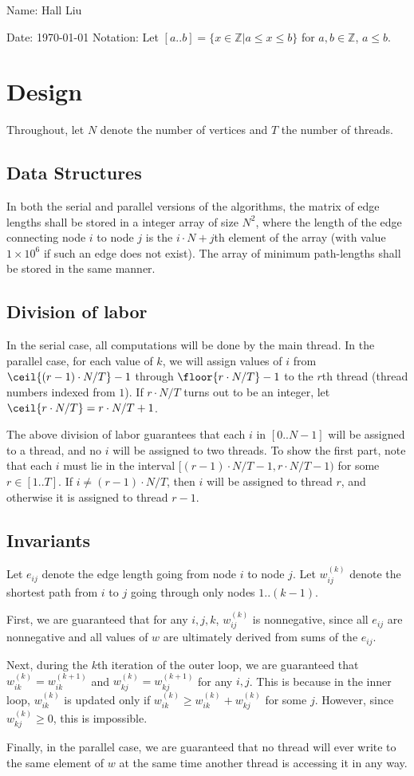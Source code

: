 \documentclass{article}
\newcommand{\zn}{\mathbb{Z}}
\begin{document}
Name: Hall Liu

Date: \today 
Notation: Let $[a..b]=\{x\in\zn|a\leq x\leq b\}$ for $a,b\in\zn$, $a\leq b$.
\section*{Design}
Throughout, let $N$ denote the number of vertices and $T$ the number of threads.
\subsection*{Data Structures}
In both the serial and parallel versions of the algorithms, the matrix of edge lengths shall be stored in a integer array of size $N^2$, where the length of the edge connecting node $i$ to node $j$ is the $i\cdot N+j$th element of the array (with value $1\times10^6$ if such an edge does not exist). The array of minimum path-lengths shall be stored in the same manner. 

\subsection*{Division of labor}
In the serial case, all computations will be done by the main thread. In the parallel case, for each value of $k$, we will assign values of $i$ from $\ceil{(r-1)\cdot N/T}-1$ through $\floor{r\cdot N/T}-1$ to the $r$th thread (thread numbers indexed from $1$). If $r\cdot N/T$ turns out to be an integer, let $\ceil{r\cdot N/T}=r\cdot N/T + 1$. 

The above division of labor guarantees that each $i$ in $[0..N-1]$ will be assigned to a thread, and no $i$ will be assigned to two threads. To show the first part, note that each $i$ must lie in the interval $[(r-1)\cdot N/T-1, r\cdot N/T-1)$ for some $r\in[1..T]$. If $i\neq (r-1)\cdot N/T$, then $i$ will be assigned to thread $r$, and otherwise it is assigned to thread $r-1$. 
\subsection*{Invariants}

Let $e_{ij}$ denote the edge length going from node $i$ to node $j$. Let $w_{ij}^{(k)}$ denote the shortest path from $i$ to $j$ going through only nodes $1..(k-1)$. 

First, we are guaranteed that for any $i, j, k$, $w_{ij}^{(k)}$ is nonnegative, since all $e_{ij}$ are nonnegative and all values of $w$ are ultimately derived from sums of the $e_{ij}$.

Next, during the $k$th iteration of the outer loop, we are guaranteed that $w_{ik}^{(k)}=w_{ik}^{(k+1)}$ and $w_{kj}^{(k)}=w_{kj}^{(k+1)}$ for any $i,j$. This is because in the inner loop, $w_{ik}^{(k)}$ is updated only if $w_{ik}^{(k)}\ge w_{ik}^{(k)}+w_{kj}^{(k)}$ for some $j$. However, since $w_{kj}^{(k)}\geq0$, this is impossible.

Finally, in the parallel case, we are guaranteed that no thread will ever write to the same element of $w$ at the same time another thread is accessing it in any way. 
\end{document}
